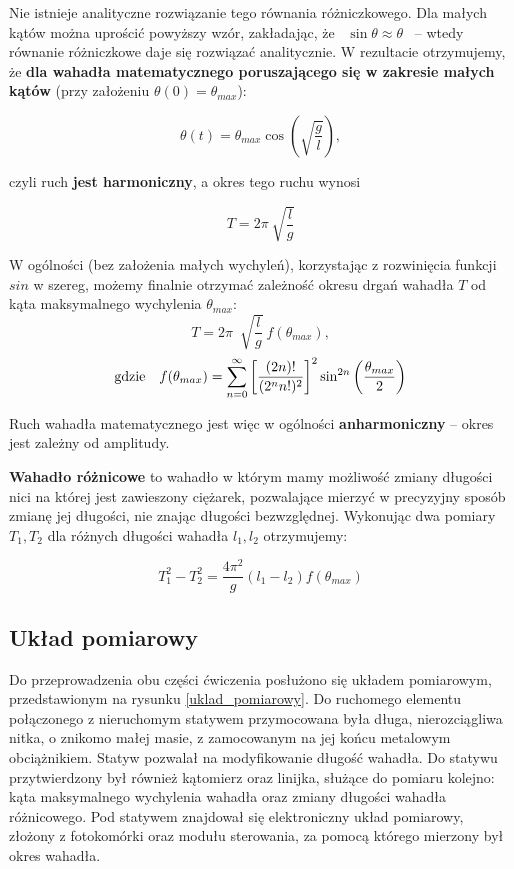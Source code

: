 \documentclass[a4paper]{article}
\newlength{\du}
\begin{document}
Nie istnieje analityczne rozwiązanie tego równania różniczkowego. Dla małych kątów
można uprościć powyższy wzór, zakładając, że \, $\sin\theta \approx \theta$ \,
-- wtedy równanie różniczkowe daje się rozwiązać analitycznie. W rezultacie otrzymujemy,
że \textbf{dla wahadła matematycznego poruszającego się w zakresie małych kątów}
(przy założeniu $\theta(0) = \theta_{max}$):

\[ \theta(t) = \theta_{max}\cos\left(\sqrt{\frac{g}{l}}\right), \]   %

czyli ruch \textbf{jest harmoniczny}, a okres tego ruchu wynosi

\[ T = 2\pi~\sqrt{\frac{l}{g}} \]


W ogólności (bez założenia małych wychyleń), korzystając z rozwinięcia funkcji $sin$
w szereg, możemy finalnie otrzymać zależność okresu drgań wahadła $T$ od kąta
maksymalnego wychylenia $\theta_{max}$:
\begin{equation} \label{eq:T}
T = 2\pi ~ \sqrt[]{\frac{l}{g}}~f(\theta_{max}) ,
\end{equation}
\begin{equation} \label{eq:f}
\text{gdzie} \enskip  \enskip f(\theta_{max}) = 
	\sum\limits_{n=0}^{\infty} 
		\left[ \frac{(2n)!}{(2^nn!)^2} \right]^2 
			\sin^{2n}\left(\frac{\theta_{max}}{2} \right)
\end{equation}


Ruch wahadła matematycznego jest więc w ogólności \textbf{anharmoniczny} -- okres
jest zależny od amplitudy.

\textbf{Wahadło różnicowe} to wahadło w którym mamy możliwość zmiany długości nici na której 
jest zawieszony ciężarek, pozwalające
mierzyć w precyzyjny sposób zmianę jej długości, nie znając długości bezwzględnej. Wykonując dwa pomiary $T_1, T_2$ dla różnych długości wahadła $l_1, l_2$ otrzymujemy:

\[ T^2_1 - T^2_2 = \frac{4\pi ^2}{g}\left(l_1-l_2\right) f(\theta_{max}) \]

\subsection{Układ pomiarowy}
Do przeprowadzenia obu części ćwiczenia posłużono się układem pomiarowym,
przedstawionym na rysunku \ref{uklad_pomiarowy}. Do ruchomego elementu 
połączonego z nieruchomym statywem przymocowana była długa, nierozciągliwa nitka, 
o znikomo małej masie, z zamocowanym na jej końcu metalowym obciążnikiem. 
Statyw pozwalał na modyfikowanie długość wahadła. Do statywu 
przytwierdzony był również kątomierz oraz linijka, służące do pomiaru kolejno:
kąta maksymalnego wychylenia wahadła oraz zmiany długości wahadła różnicowego.
Pod statywem znajdował się elektroniczny układ pomiarowy, złożony z fotokomórki
oraz modułu sterowania, za pomocą którego mierzony był okres wahadła.
\end{document}
